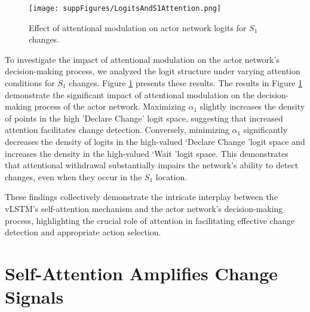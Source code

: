 \documentclass[12pt]{article}
\begin{document}
\begin{figure}[htbp]
    \centering
    \texttt{[image: suppFigures/LogitsAndS1Attention.png]}
    \caption{Effect of attentional modulation on actor network logits for $S_1$ changes.}
    \label{fig:LogitsS1Attention}
\end{figure}

To investigate the impact of attentional modulation on the actor network's decision-making process, we analyzed the logit structure under varying attention conditions for $S_1$ changes. Figure \ref{fig:LogitsS1Attention} presents these results. The results in Figure \ref{fig:LogitsS1Attention} demonstrate the significant impact of attentional modulation on the decision-making process of the actor network. Maximizing $\alpha_1$ slightly increases the density of points in the high 'Declare Change' logit space, suggesting that increased attention facilitates change detection. Conversely, minimizing $\alpha_1$ significantly decreases the density of logits in the high-valued \lq Declare Change \rq logit space and increases the density in the high-valued \lq Wait \rq logit space. This demonstrates that attentional withdrawal substantially impairs the network's ability to detect changes, even when they occur in the $S_1$ location.

These findings collectively demonstrate the intricate interplay between the vLSTM's self-attention mechanism and the actor network's decision-making process, highlighting the crucial role of attention in facilitating effective change detection and appropriate action selection.

\newpage

\section{Self-Attention Amplifies Change Signals}
\end{document}
